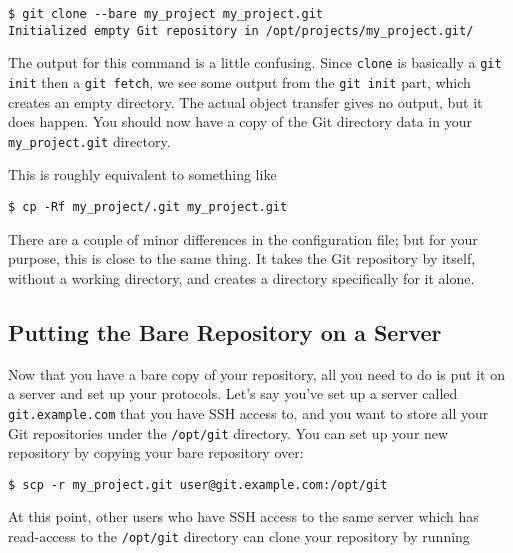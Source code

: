 \documentclass[a4paper]{book}
\begin{document}
\begin{shaded}\begin{verbatim}
$ git clone --bare my_project my_project.git
Initialized empty Git repository in /opt/projects/my_project.git/
\end{verbatim}\end{shaded}

The output for this command is a little confusing. Since \texttt{clone} is basically a \texttt{git init} then a \texttt{git fetch}, we see some output from the \texttt{git init} part, which creates an empty directory. The actual object transfer gives no output, but it does happen. You should now have a copy of the Git directory data in your \texttt{my\_project.git} directory.

This is roughly equivalent to something like

\begin{shaded}\begin{verbatim}
$ cp -Rf my_project/.git my_project.git
\end{verbatim}\end{shaded}

There are a couple of minor differences in the configuration file; but for your purpose, this is close to the same thing. It takes the Git repository by itself, without a working directory, and creates a directory specifically for it alone.

\subsection{Putting the Bare Repository on a Server}

Now that you have a bare copy of your repository, all you need to do is put it on a server and set up your protocols. Let's say you've set up a server called \texttt{git.example.com} that you have SSH access to, and you want to store all your Git repositories under the \texttt{/opt/git} directory. You can set up your new repository by copying your bare repository over:

\begin{shaded}\begin{verbatim}
$ scp -r my_project.git user@git.example.com:/opt/git
\end{verbatim}\end{shaded}

At this point, other users who have SSH access to the same server which has read-access to the \texttt{/opt/git} directory can clone your repository by running
\end{document}
